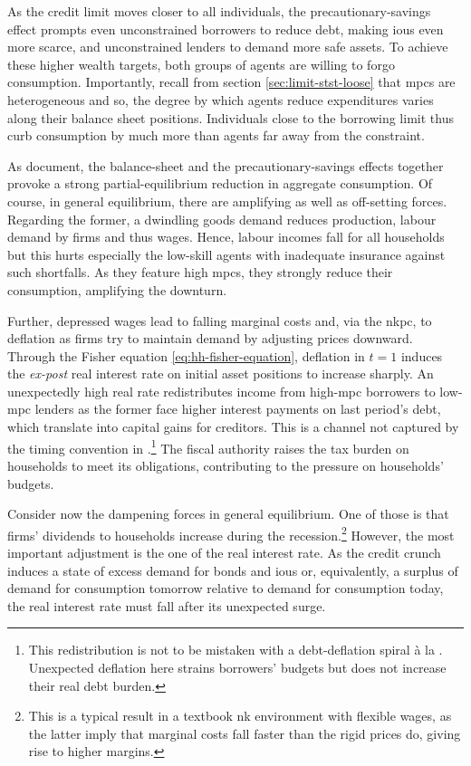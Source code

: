 \documentclass[a4paper,12pt]{article} %
\numberwithin{equation}{section} %
\numberwithin{figure}{section}
\numberwithin{table}{section}
\begin{document}
As the credit limit moves closer to all individuals, the precautionary-savings effect prompts even unconstrained borrowers to reduce debt, making \Gls{iou}s even more scarce, and unconstrained lenders to demand more safe assets. To achieve these higher wealth targets, both groups of agents are willing to forgo consumption. Importantly, recall from section \ref{sec:limit-stst-loose} that \Gls{mpc}s are heterogeneous and so, the degree by which agents reduce expenditures varies along their balance sheet positions. Individuals close to the borrowing limit thus curb consumption by much more than agents far away from the constraint.

As \textcite{gl2017} document, the balance-sheet and the precautionary-savings effects together provoke a strong partial-equilibrium reduction in aggregate consumption. Of course, in general equilibrium, there are amplifying as well as off-setting forces. Regarding the former, a dwindling goods demand reduces production, labour demand by firms and thus wages. Hence, labour incomes fall for all households but this hurts especially the low-skill agents with inadequate insurance against such shortfalls. As they feature high \Gls{mpc}s, they strongly reduce their consumption, amplifying the downturn.

Further, depressed wages lead to falling marginal costs and, via the \Gls{nkpc}, to deflation as firms try to maintain demand by adjusting prices downward. Through the Fisher equation \eqref{eq:hh-fisher-equation}, deflation in $t=1$ induces the \textit{ex-post} real interest rate on initial asset positions to increase sharply. An unexpectedly high real rate redistributes income from high-\Gls{mpc} borrowers to low-\Gls{mpc} lenders as the former face higher interest payments on last period's debt, which translate into capital gains for creditors. This is a channel not captured by the timing convention in \textcite{gl2017}.\footnote{This redistribution is not to be mistaken with a debt-deflation spiral à la \textcite{fisher1933}. Unexpected deflation here strains borrowers' budgets but does not increase their real debt burden.} The fiscal authority raises the tax burden on households to meet its obligations, contributing to the pressure on households' budgets.

Consider now the dampening forces in general equilibrium. One of those is that firms' dividends to households increase during the recession.\footnote{This is a typical result in a textbook \Gls{nk} environment with flexible wages, as the latter imply that marginal costs fall faster than the rigid prices do, giving rise to higher margins.} However, the most important adjustment is the one of the real interest rate. As the credit crunch induces a state of excess demand for bonds and \Gls{iou}s or, equivalently, a surplus of demand for consumption tomorrow relative to demand for consumption today, the real interest rate must fall after its unexpected surge. 
\end{document}
